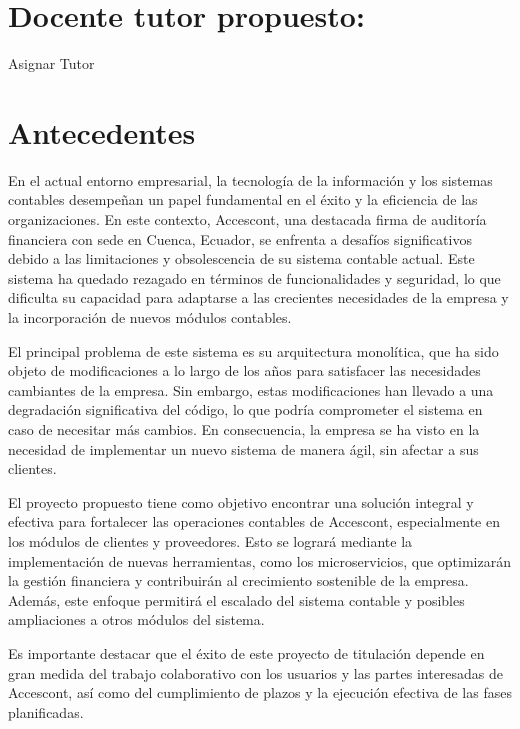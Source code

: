 \documentclass{article}
\begin{document}
\section{Docente tutor propuesto:   }
\begin{center}
Asignar Tutor
\end{center}
\section{Antecedentes}

En el actual entorno empresarial, la tecnología de la información y los sistemas contables desempeñan un papel fundamental en el éxito y la eficiencia de las organizaciones. En este contexto, Accescont, una destacada firma de auditoría financiera con sede en Cuenca, Ecuador, se enfrenta a desafíos significativos debido a las limitaciones y obsolescencia de su sistema contable actual. Este sistema ha quedado rezagado en términos de funcionalidades y seguridad, lo que dificulta su capacidad para adaptarse a las crecientes necesidades de la empresa y la incorporación de nuevos módulos contables.

El principal problema de este sistema es su arquitectura monolítica, que ha sido objeto de modificaciones a lo largo de los años para satisfacer las necesidades cambiantes de la empresa. Sin embargo, estas modificaciones han llevado a una degradación significativa del código, lo que podría comprometer el sistema en caso de necesitar más cambios. En consecuencia, la empresa se ha visto en la necesidad de implementar un nuevo sistema de manera ágil, sin afectar a sus clientes.

El proyecto propuesto tiene como objetivo encontrar una solución integral y efectiva para fortalecer las operaciones contables de Accescont, especialmente en los módulos de clientes y proveedores. Esto se logrará mediante la implementación de nuevas herramientas, como los microservicios, que optimizarán la gestión financiera y contribuirán al crecimiento sostenible de la empresa. Además, este enfoque permitirá el escalado del sistema contable y posibles ampliaciones a otros módulos del sistema.

Es importante destacar que el éxito de este proyecto de titulación depende en gran medida del trabajo colaborativo con los usuarios y las partes interesadas de Accescont, así como del cumplimiento de plazos y la ejecución efectiva de las fases planificadas. 

       
\end{document}
